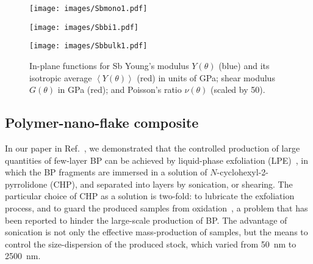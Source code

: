 

\begin{figure}[th!]
\begin{subfloat}[Monolayer Sb]{
\texttt{[image: images/Sbmono1.pdf]}
  \label{fig:sbmono1}}
\end{subfloat}
%
\begin{subfloat}[Bilayer Sb]{
\texttt{[image: images/Sbbi1.pdf]}
  \label{fig:sbbi1}}
\end{subfloat}
%
\begin{subfloat}[Bulk Sb]{
\texttt{[image: images/Sbbulk1.pdf]}
  \label{fig:sbbulk1}}
\end{subfloat}
%
\caption[Antimony in-plane mechanical properties]{
In-plane functions for Sb 
Young's modulus $Y\left(\theta\right)$ (blue)
and its isotropic average $\left<Y\left(\theta\right)\right>$ 
(red) in units of GPa; 
shear modulus $G\left(\theta\right)$ in GPa (red);
and Poisson's ratio $\nu\left(\theta\right)$ 
(scaled by 50).
}
\label{fig:sb_2d_in_plane_figs}
\end{figure}


\clearpage
\subsection{Polymer-nano-flake composite}
\label{sec:comparison_to_exp}
%
In our paper in Ref.~\cite{PMID:26469634}, 
we demonstrated that the 
controlled production of large quantities 
of few-layer BP can be achieved by 
liquid-phase exfoliation (LPE)~\cite{Nicolosi1226419}, 
in which the BP fragments are immersed in 
a solution of $N$-cyclohexyl-2- pyrrolidone (CHP), 
and separated into layers 
by sonication, or shearing.
%
The particular choice of CHP 
as a solution is two-fold: 
to lubricate the exfoliation process, 
and to guard the produced samples from oxidation~\cite{Li2014,Zant2014,doi:10.1021/nl5032293}, 
a problem that has been reported  
to hinder the large-scale production of BP. 
%
The advantage of sonication is 
not only the effective mass-production of samples, 
but the means to control the size-dispersion 
of the produced stock, 
which varied from 50~nm to 2500~nm.

